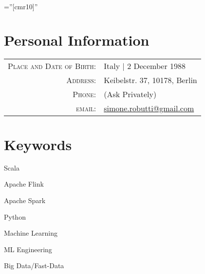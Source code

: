 \documentclass[a4paper,10pt]{article} %
\begin{document}
\newcommand{\spezzalinea}{
	\multicolumn{1}{r}{}&\\
}

\pagestyle{empty} %

\font\fb=''[cmr10]'' %


\par{\bigskip\par} %
\begin{minipage}{\textwidth}

\begin{minipage}[t]{0.65\textwidth}
\section{Personal Information}
\begin{tabular}{rl}
\textsc{Place and Date of Birth:} & Italy  | 2 December 1988 \\
\textsc{Address:} & Keibelstr. 37, 10178, Berlin \\
\textsc{Phone:} & (Ask Privately)\\
\textsc{email:} & \href{mailto:simone.robutti@gmail.com}{simone.robutti@gmail.com}
\end{tabular}

\end{minipage}
\hfill
\begin{minipage}[t]{0.25\textwidth}
\section{\hfill Keywords}
\raggedleft

Scala

Apache Flink

Apache Spark

Python

Machine Learning 

ML Engineering

Big Data/Fast-Data
\end{minipage}

\end{minipage}

\end{document}
